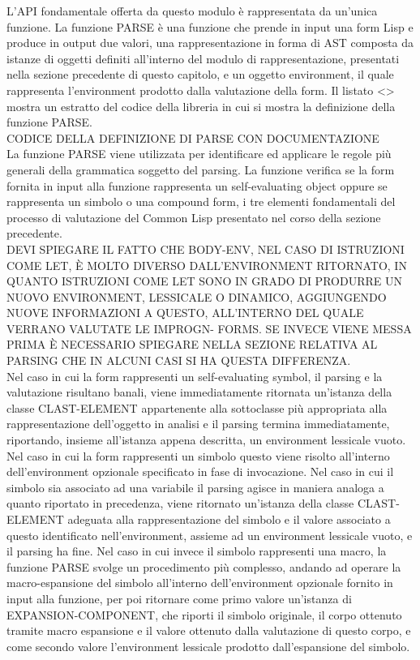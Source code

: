 L’API fondamentale offerta da questo modulo è rappresentata da un’unica
funzione. La funzione PARSE è una funzione che prende in input una form Lisp e
produce in output due valori, una rappresentazione in forma di AST composta da
istanze di oggetti definiti all’interno del modulo di rappresentazione,
presentati nella sezione precedente di questo capitolo, e un oggetto
environment, il quale rappresenta l’environment prodotto dalla valutazione
della form. Il listato <> mostra un estratto del codice della libreria in cui
si mostra la definizione della funzione PARSE.\\

CODICE DELLA DEFINIZIONE DI PARSE CON DOCUMENTAZIONE\\

La funzione PARSE viene utilizzata per identificare ed applicare le regole più
generali della grammatica soggetto del parsing. La funzione verifica se la
form fornita in input alla funzione rappresenta un self-evaluating object
oppure se rappresenta un simbolo o una compound form, i tre elementi
fondamentali del processo di valutazione del Common Lisp presentato nel corso
della sezione precedente.\\

DEVI SPIEGARE IL FATTO CHE BODY-ENV, NEL CASO DI ISTRUZIONI COME LET, È MOLTO
DIVERSO DALL’ENVIRONMENT RITORNATO, IN QUANTO ISTRUZIONI COME LET SONO IN
GRADO DI PRODURRE UN NUOVO ENVIRONMENT, LESSICALE O DINAMICO, AGGIUNGENDO
NUOVE INFORMAZIONI A QUESTO, ALL’INTERNO DEL QUALE VERRANO VALUTATE LE
IMPROGN- FORMS. SE INVECE VIENE MESSA PRIMA È NECESSARIO SPIEGARE NELLA
SEZIONE RELATIVA AL PARSING CHE IN ALCUNI CASI SI HA QUESTA DIFFERENZA.\\

Nel caso in cui la form rappresenti un self-evaluating symbol, il parsing e la
valutazione risultano banali, viene immediatamente ritornata un’istanza della
classe CLAST-ELEMENT appartenente alla sottoclasse più appropriata alla
rappresentazione dell’oggetto in analisi e il parsing termina immediatamente,
riportando, insieme all’istanza appena descritta, un environment lessicale
vuoto.\\

Nel caso in cui la form rappresenti un simbolo questo viene risolto
all’interno dell’environment opzionale specificato in fase di invocazione. Nel
caso in cui il simbolo sia associato ad una variabile il parsing agisce in
maniera analoga a quanto riportato in precedenza, viene ritornato un’istanza
della classe CLAST-ELEMENT adeguata alla rappresentazione del simbolo e il
valore associato a questo identificato nell’environment, assieme ad un
environment lessicale vuoto, e il parsing ha fine. Nel caso in cui invece il
simbolo rappresenti una macro, la funzione PARSE svolge un procedimento più
complesso, andando ad operare la macro-espansione del simbolo all’interno
dell’environment opzionale fornito in input alla funzione, per poi ritornare
come primo valore un’istanza di EXPANSION-COMPONENT, che riporti il simbolo
originale, il corpo ottenuto tramite macro espansione e il valore ottenuto
dalla valutazione di questo corpo, e come secondo valore l’environment
lessicale prodotto dall’espansione del simbolo.\\

